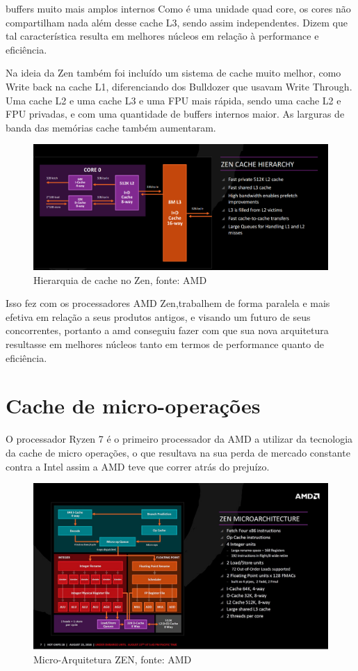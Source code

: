 \documentclass[12pt]{article}
\begin{document}
buffers muito mais amplos internos
Como é uma unidade quad core, os cores não compartilham nada além desse cache L3, sendo assim independentes. Dizem que tal característica resulta em melhores núcleos em relação à performance e eficiência.

Na ideia da Zen também foi incluído um sistema de cache muito melhor, como Write back na cache L1, diferenciando dos Bulldozer que usavam Write Through. Uma cache L2 e uma cache L3 e uma FPU mais rápida, sendo uma cache L2 e FPU privadas, e com uma quantidade de buffers internos maior. As larguras de banda das memórias cache também aumentaram.

\begin{figure}[h!]
\centering
\includegraphics[width=120mm,scale=0.8]{ZenCache.png}
\caption{Hierarquia de cache no Zen, fonte: AMD}
\label{fig:amd}
\end{figure}
Isso fez com os processadores AMD Zen,trabalhem de forma paralela e mais efetiva em relação a seus produtos antigos, e visando um futuro de seus concorrentes, portanto a amd conseguiu fazer com que sua nova arquitetura resultasse em melhores núcleos tanto em termos de performance quanto de eficiência.

\newpage

\section{Cache de micro-operações}

O processador Ryzen 7 é o primeiro processador da AMD a utilizar da tecnologia da cache de micro operações, o que resultava na sua perda de mercado constante contra a Intel assim a AMD teve que correr atrás do prejuízo.

\begin{figure}[H]
\centering
\includegraphics[width=120mm,scale=0.8]{micro-op_cache.jpg}
\caption{Micro-Arquitetura ZEN, fonte: AMD}
\label{fig:AMD CORE}
\end{figure}
\end{document}

